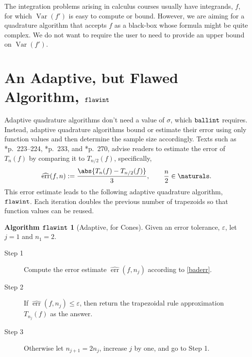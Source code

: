 \documentclass[]{article}
\DeclareMathOperator{\flawinteg}{\texttt{\textup{flawint}}}
\DeclareMathOperator{\ballinteg}{\texttt{\textup{ballint}}}
\DeclareMathOperator{\Var}{Var}
\DeclareMathOperator{\err}{err}
\newcommand{\herr}{\widehat{\err}}
\theoremstyle{definition}
\newtheorem*{flawalgo}{Algorithm $\flawinteg$}
\theoremstyle{remark}
\begin{document}
The integration problems arising in calculus courses usually have integrands, $f$, for which $\Var(f')$ is easy to compute or bound.  However, we are aiming for a quadrature algorithm that accepts $f$ as a black-box whose formula might be quite complex.  We do not want to require the user to need to provide an upper bound on $\Var(f')$.


\section{An Adaptive, but Flawed Algorithm, $\flawinteg$} \label{flawstopsec}

Adaptive quadrature algorithms don't need a value of $\sigma$, which $\ballinteg$ requires.  Instead, adaptive quadrature algorithms bound or estimate their error using only function values and then determine the sample size accordingly.  Texts such as *{p.\ 223--224}, *{p.\ 233}, and  *{p.\ 270}, advise readers to estimate the error of $T_n(f)$ by comparing it to $T_{n/2}(f)$, specifically,
\begin{equation}\label{baderr}
\herr(f,n) := \frac{\abs{T_n(f) - T_{n/2}(f)}}{3}, \qquad \frac n2 \in \naturals.
\end{equation}
This error estimate leads to the following adaptive quadrature algorithm, $\flawinteg$. Each iteration doubles the previous number of trapezoids so that function values can be reused. 

\begin{flawalgo}[Adaptive, for Cones] \label{baderralgo} Given an error tolerance, $\varepsilon$, let $j=1$ and $n_1=2$.

\begin{description} 

\item[Step 1] Compute the error estimate $\herr(f,n_j)$ according to \eqref{baderr}.

\item [Step 2] If $\herr(f,n_j) \le \varepsilon$, then return the trapezoidal rule approximation $T_{n_j}(f)$ as the answer.  

\item [Step 3] Otherwise let $n_{j+1}=2 n_j$, increase $j$ by one, and go to Step 1.

\end{description}

\end{flawalgo}
\end{document}
